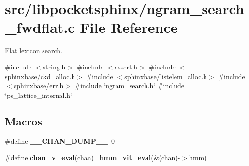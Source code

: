 \section{src/libpocketsphinx/ngram\+\_\+search\+\_\+fwdflat.c File Reference}
\label{ngram__search__fwdflat_8c}


Flat lexicon search.  


{\ttfamily \#include $<$string.\+h$>$}\newline
{\ttfamily \#include $<$assert.\+h$>$}\newline
{\ttfamily \#include $<$sphinxbase/ckd\+\_\+alloc.\+h$>$}\newline
{\ttfamily \#include $<$sphinxbase/listelem\+\_\+alloc.\+h$>$}\newline
{\ttfamily \#include $<$sphinxbase/err.\+h$>$}\newline
{\ttfamily \#include \char`\"{}ngram\+\_\+search.\+h\char`\"{}}\newline
{\ttfamily \#include \char`\"{}ps\+\_\+lattice\+\_\+internal.\+h\char`\"{}}\newline
\subsection*{Macros}
\begin{DoxyCompactItemize}
\item 
\mbox{\label{ngram__search__fwdflat_8c_a58360b0a332f35742f89edce94c649aa}} 
\#define {\bfseries \+\_\+\+\_\+\+C\+H\+A\+N\+\_\+\+D\+U\+M\+P\+\_\+\+\_\+}~0
\item 
\mbox{\label{ngram__search__fwdflat_8c_a268c1fbc6483e1ab06c007222f08d9ad}} 
\#define {\bfseries chan\+\_\+v\+\_\+eval}(chan)~\textbf{ hmm\+\_\+vit\+\_\+eval}(\&(chan)-\/$>$hmm)
\end{DoxyCompactItemize}
